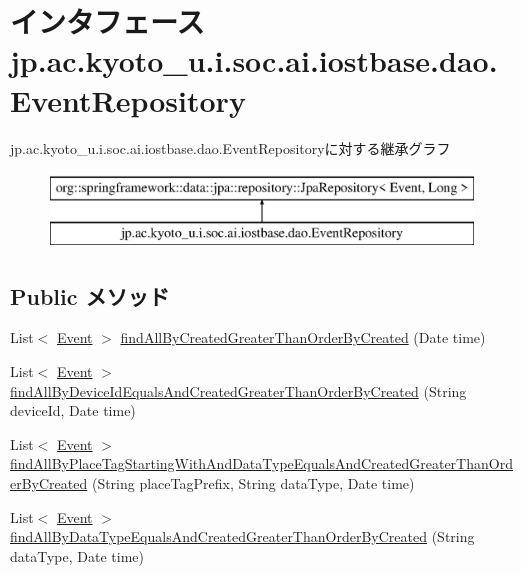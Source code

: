 \hypertarget{interfacejp_1_1ac_1_1kyoto__u_1_1i_1_1soc_1_1ai_1_1iostbase_1_1dao_1_1_event_repository}{\section{インタフェース jp.\-ac.\-kyoto\-\_\-u.\-i.\-soc.\-ai.\-iostbase.\-dao.\-Event\-Repository}
\label{interfacejp_1_1ac_1_1kyoto__u_1_1i_1_1soc_1_1ai_1_1iostbase_1_1dao_1_1_event_repository}
}
jp.\-ac.\-kyoto\-\_\-u.\-i.\-soc.\-ai.\-iostbase.\-dao.\-Event\-Repositoryに対する継承グラフ\begin{figure}[H]
\begin{center}
\leavevmode
\includegraphics[height=2.000000cm]{interfacejp_1_1ac_1_1kyoto__u_1_1i_1_1soc_1_1ai_1_1iostbase_1_1dao_1_1_event_repository}
\end{center}
\end{figure}
\subsection*{Public メソッド}
\begin{DoxyCompactItemize}
\item 
List$<$ \hyperlink{classjp_1_1ac_1_1kyoto__u_1_1i_1_1soc_1_1ai_1_1iostbase_1_1dao_1_1entity_1_1_event}{Event} $>$ \hyperlink{interfacejp_1_1ac_1_1kyoto__u_1_1i_1_1soc_1_1ai_1_1iostbase_1_1dao_1_1_event_repository_a591381b29b497aaa27b41dab0abb83e3}{find\-All\-By\-Created\-Greater\-Than\-Order\-By\-Created} (Date time)
\item 
List$<$ \hyperlink{classjp_1_1ac_1_1kyoto__u_1_1i_1_1soc_1_1ai_1_1iostbase_1_1dao_1_1entity_1_1_event}{Event} $>$ \hyperlink{interfacejp_1_1ac_1_1kyoto__u_1_1i_1_1soc_1_1ai_1_1iostbase_1_1dao_1_1_event_repository_a611822bba416d0cfc0dbc9fbba374b5d}{find\-All\-By\-Device\-Id\-Equals\-And\-Created\-Greater\-Than\-Order\-By\-Created} (String device\-Id, Date time)
\item 
List$<$ \hyperlink{classjp_1_1ac_1_1kyoto__u_1_1i_1_1soc_1_1ai_1_1iostbase_1_1dao_1_1entity_1_1_event}{Event} $>$ \hyperlink{interfacejp_1_1ac_1_1kyoto__u_1_1i_1_1soc_1_1ai_1_1iostbase_1_1dao_1_1_event_repository_a67ed1dd2d154496490cc7fd497d2591c}{find\-All\-By\-Place\-Tag\-Starting\-With\-And\-Data\-Type\-Equals\-And\-Created\-Greater\-Than\-Order\-By\-Created} (String place\-Tag\-Prefix, String data\-Type, Date time)
\item 
List$<$ \hyperlink{classjp_1_1ac_1_1kyoto__u_1_1i_1_1soc_1_1ai_1_1iostbase_1_1dao_1_1entity_1_1_event}{Event} $>$ \hyperlink{interfacejp_1_1ac_1_1kyoto__u_1_1i_1_1soc_1_1ai_1_1iostbase_1_1dao_1_1_event_repository_ac61ad3f1e33d148ab3b6409388cb1a2f}{find\-All\-By\-Data\-Type\-Equals\-And\-Created\-Greater\-Than\-Order\-By\-Created} (String data\-Type, Date time)
\end{DoxyCompactItemize}



